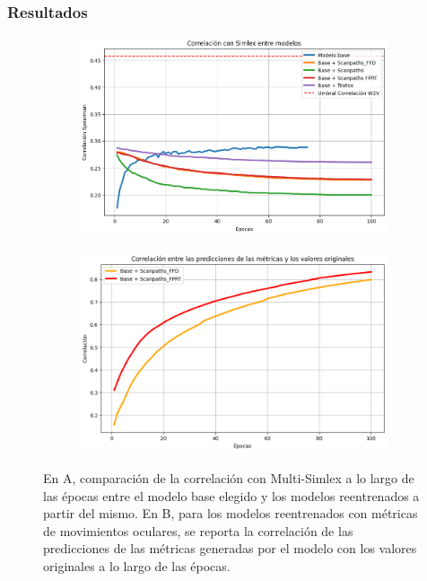 \subsubsection{Resultados}

\begin{figure}[H]
    \centering
    \begin{subfigure}[b]{0.8\textwidth}
        \centering
        \includegraphics[width=1\textwidth]{imagenes/corr_reentrenamiento.png}
        \caption{}
        \label{fig:corr_reentrenamiento.png}
    \end{subfigure}
    \hfill
    \begin{subfigure}[b]{0.8\textwidth}
        \centering
        \includegraphics[width=1\textwidth]{imagenes/corr_pred_reentrenamiento.png}
        \caption{}
        \label{fig:corr_pred_reentrenamiento.png}
    \end{subfigure}
    \caption{En A, comparación de la correlación con Multi-Simlex a lo largo de las 
    épocas entre el modelo base elegido y los modelos reentrenados a partir del 
    mismo. En B, para los modelos reentrenados con métricas de movimientos 
    oculares, se reporta la correlación de las predicciones de las métricas 
    generadas por el modelo con los valores originales a lo largo de las épocas.}
    \label{fig:simlex_reentrenamiento}
\end{figure}

